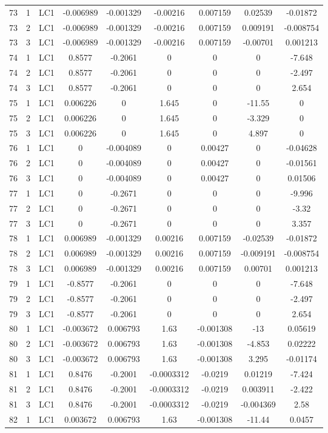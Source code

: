 \documentclass{article}%
\begin{document}
\begin{longtable}{| c c c | c c c c c c |}
73&1&LC1&{-}0.006989&{-}0.001329&{-}0.00216&0.007159&0.02539&{-}0.01872\\%
73&2&LC1&{-}0.006989&{-}0.001329&{-}0.00216&0.007159&0.009191&{-}0.008754\\%
73&3&LC1&{-}0.006989&{-}0.001329&{-}0.00216&0.007159&{-}0.00701&0.001213\\%
74&1&LC1&0.8577&{-}0.2061&0&0&0&{-}7.648\\%
74&2&LC1&0.8577&{-}0.2061&0&0&0&{-}2.497\\%
74&3&LC1&0.8577&{-}0.2061&0&0&0&2.654\\%
75&1&LC1&0.006226&0&1.645&0&{-}11.55&0\\%
75&2&LC1&0.006226&0&1.645&0&{-}3.329&0\\%
75&3&LC1&0.006226&0&1.645&0&4.897&0\\%
76&1&LC1&0&{-}0.004089&0&0.00427&0&{-}0.04628\\%
76&2&LC1&0&{-}0.004089&0&0.00427&0&{-}0.01561\\%
76&3&LC1&0&{-}0.004089&0&0.00427&0&0.01506\\%
77&1&LC1&0&{-}0.2671&0&0&0&{-}9.996\\%
77&2&LC1&0&{-}0.2671&0&0&0&{-}3.32\\%
77&3&LC1&0&{-}0.2671&0&0&0&3.357\\%
78&1&LC1&0.006989&{-}0.001329&0.00216&0.007159&{-}0.02539&{-}0.01872\\%
78&2&LC1&0.006989&{-}0.001329&0.00216&0.007159&{-}0.009191&{-}0.008754\\%
78&3&LC1&0.006989&{-}0.001329&0.00216&0.007159&0.00701&0.001213\\%
79&1&LC1&{-}0.8577&{-}0.2061&0&0&0&{-}7.648\\%
79&2&LC1&{-}0.8577&{-}0.2061&0&0&0&{-}2.497\\%
79&3&LC1&{-}0.8577&{-}0.2061&0&0&0&2.654\\%
80&1&LC1&{-}0.003672&0.006793&1.63&{-}0.001308&{-}13&0.05619\\%
80&2&LC1&{-}0.003672&0.006793&1.63&{-}0.001308&{-}4.853&0.02222\\%
80&3&LC1&{-}0.003672&0.006793&1.63&{-}0.001308&3.295&{-}0.01174\\%
81&1&LC1&0.8476&{-}0.2001&{-}0.0003312&{-}0.0219&0.01219&{-}7.424\\%
81&2&LC1&0.8476&{-}0.2001&{-}0.0003312&{-}0.0219&0.003911&{-}2.422\\%
81&3&LC1&0.8476&{-}0.2001&{-}0.0003312&{-}0.0219&{-}0.004369&2.58\\%
82&1&LC1&0.003672&0.006793&1.63&{-}0.001308&{-}11.44&0.0457\\%

\end{longtable}
\end{document}
